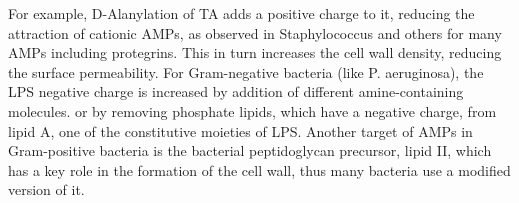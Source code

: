 \documentclass[a4paper,11pt]{extreport}
\begin{document}
For example, D-Alanylation of TA adds a positive charge to it, reducing the attraction of cationic AMPs, as observed in Staphylococcus and others for many AMPs including protegrins.\cite{Peschel1999,Fabretti2006,Saar-Dover2012}
This in turn increases the cell wall density, reducing the surface permeability.\cite{Saar-Dover2012}
%
For Gram-negative bacteria (like P. aeruginosa), the LPS negative charge is increased by addition of different amine-containing molecules.\cite{Moskowitz2004,Gunn1998}
or by removing phosphate lipids, which have a negative charge, from lipid A, one of the constitutive moieties of LPS.\cite{Wang2004,Wang2006}
Another target of AMPs in Gram-positive bacteria is the bacterial peptidoglycan precursor, lipid II, which has a key role in the formation of the cell wall, thus many bacteria use a modified version of it.
\end{document}
